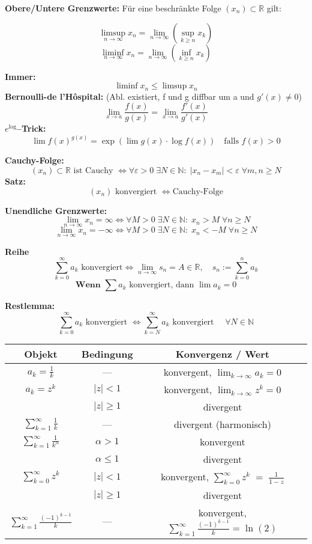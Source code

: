 \textbf{Obere/Untere Grenzwerte:}  
Für eine beschränkte Folge \( (x_n) \subset \mathbb{R} \) gilt:

\[
\limsup\limits_{n \to \infty} x_n = \lim\limits_{n \to \infty} \left( \sup_{k \geq n} x_k \right)
\]
\[
\liminf\limits_{n \to \infty} x_n = \lim\limits_{n \to \infty} \left( \inf_{k \geq n} x_k \right)
\]

\textbf{Immer:}  
\[
\liminf x_n \leq \limsup x_n
\]
\textbf{Bernoulli-de l'Hôspital:} (Abl. existiert, f und g diffbar um a und $g'(x) \not = 0$)
\[
\lim\limits_{x \to a} \frac{f(x)}{g(x)} = \lim\limits_{x \to a} \frac{f'(x)}{g'(x)}
\]
\textbf{\( e^{\log} \)–Trick:}  
\[
\lim f(x)^{g(x)} = \exp\left( \lim g(x) \cdot \log f(x) \right)
\quad \text{falls } f(x) > 0
\]

\textbf{Cauchy-Folge:}  
\[
(x_n) \subset \mathbb{R} \text{ ist Cauchy } \Leftrightarrow  
\forall \varepsilon > 0\; \exists N \in \mathbb{N}:\; |x_n - x_m| < \varepsilon \; \forall m,n \geq N
\]
\textbf{Satz:}  
\[
(x_n) \text{ konvergiert } \Leftrightarrow \text{Cauchy-Folge}
\]

\textbf{Unendliche Grenzwerte:}  
\[
\lim_{n \to \infty} x_n = \infty \Leftrightarrow  
\forall M > 0\; \exists N \in \mathbb{N}:\; x_n > M\; \forall n \geq N
\]
\[
\lim_{n \to \infty} x_n = -\infty \Leftrightarrow  
\forall M > 0\; \exists N \in \mathbb{N}:\; x_n < -M\; \forall n \geq N
\]

\textbf{Reihe }
\[
\sum_{k=0}^\infty a_k \text{ konvergiert} \Leftrightarrow 
\lim_{n \to \infty} s_n = A \in \mathbb{R},\quad s_n := \sum_{k=0}^n a_k
\]
\[
\textbf{Wenn } \sum a_k \text{ konvergiert, dann } \lim a_k = 0
\]

\textbf{Restlemma:}  
\[
\sum_{k=0}^\infty a_k \text{ konvergiert } \Leftrightarrow  
\sum_{k=N}^\infty a_k \text{ konvergiert } \quad \forall N \in \mathbb{N}
\]
\footnotesize
\begin{tabular}{|c|c|c|}
\hline
\textbf{Objekt} & \textbf{Bedingung} & \textbf{Konvergenz / Wert} \\
\hline
$a_k = \frac{1}{k}$ 
  & — 
  & konvergent, $\displaystyle\lim_{k\to\infty}a_k = 0$ \\
\hline
$a_k = z^k$ 
  & $|z|<1$ 
  & konvergent, $\displaystyle\lim_{k\to\infty}z^k = 0$ \\
  & $|z|\ge1$ 
  & divergent \\
\hline
$\displaystyle \sum_{k=1}^\infty \frac{1}{k}$ 
  & — 
  & divergent (harmonisch) \\
\hline
$\displaystyle \sum_{k=1}^\infty \frac{1}{k^\alpha}$ 
  & $\alpha > 1$ 
  & konvergent \\
  & $\alpha \le 1$ 
  & divergent \\
\hline
$\displaystyle \sum_{k=0}^\infty z^k$ 
  & $|z|<1$ 
  & konvergent, $\displaystyle\sum_{k=0}^\infty z^k \;=\;\frac{1}{1-z}$ \\
  & $|z|\ge1$ 
  & divergent \\
\hline
$\displaystyle \sum_{k=1}^\infty \frac{(-1)^{k-1}}{k}$ 
  & — 
  & konvergent, $\displaystyle\sum_{k=1}^\infty \frac{(-1)^{k-1}}{k} = \ln(2)$ \\
\hline
\end{tabular}



